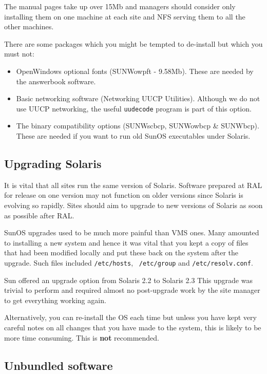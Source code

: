 The manual pages take up over 15Mb and managers should consider only installing
them on one machine at each site and NFS serving them to all the other
machines.

There are some packages which you might be tempted to de-install but which
you must not:

\begin{itemize}

\item OpenWindows optional fonts (SUNWowpft - 9.58Mb).
These are needed by the answerbook software.

\item Basic networking software (Networking UUCP Utilities).
Although we do not use UUCP networking, the useful \verb+uudecode+ program
is part of this option.

\item The binary compatibility options (SUNWscbcp, SUNWowbcp \& SUNWbcp). These
are needed if you want to run old SunOS executables under Solaris.

\end{itemize}

\subsection {Upgrading Solaris}

It is vital that all sites run the same version of Solaris. Software prepared
at RAL for release on one version may not function on older versions
since Solaris is evolving so rapidly.
Sites should aim to upgrade to new versions of Solaris as soon as
possible after RAL.

SunOS upgrades used to be much more painful than VMS ones.
Many amounted to installing a new system  and hence it was vital that you kept
a copy of files that had  been modified locally and put these back on the
system after the upgrade. Such files included {\tt /etc/hosts}, {\tt
/etc/group} and {\tt /etc/resolv.conf}.

Sun offered an upgrade option from Solaris 2.2 to Solaris 2.3
This upgrade was trivial to perform  and required almost no
post-upgrade work by the site manager to get everything working again.

Alternatively, you can re-install the OS each time but unless you have
kept very careful notes on all changes that you have made to the system,
this is likely to be more time consuming. This is {\bf not} recommended.

\subsection{Unbundled software}


